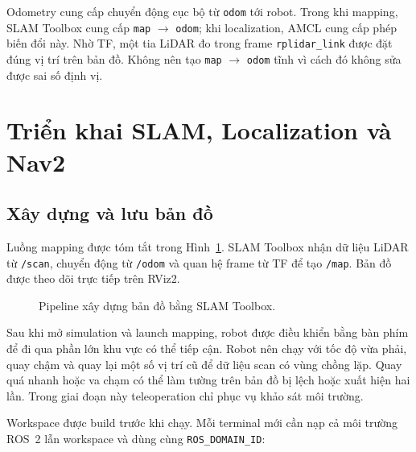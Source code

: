 \documentclass[12pt,a4paper]{article}
\begin{document}
Odometry cung cấp chuyển động cục bộ từ \texttt{odom} tới robot. Trong khi
mapping, SLAM Toolbox cung cấp \texttt{map} $\rightarrow$ \texttt{odom}; khi
localization, AMCL cung cấp phép biến đổi này. Nhờ TF, một tia LiDAR đo trong
frame \texttt{rplidar\_link} được đặt đúng vị trí trên bản đồ. Không nên tạo
\texttt{map} $\rightarrow$ \texttt{odom} tĩnh vì cách đó không sửa được sai số
định vị.

\section{Triển khai SLAM, Localization và Nav2}

\subsection{Xây dựng và lưu bản đồ}

Luồng mapping được tóm tắt trong Hình~\ref{fig:slam-flow}. SLAM Toolbox nhận
dữ liệu LiDAR từ \texttt{/scan}, chuyển động từ \texttt{/odom} và quan hệ frame
từ TF để tạo \texttt{/map}. Bản đồ được theo dõi trực tiếp trên RViz2.

\begin{figure}[htbp]
  \centering
  \caption{Pipeline xây dựng bản đồ bằng SLAM Toolbox.}
  \label{fig:slam-flow}
\end{figure}

Sau khi mở simulation và launch mapping, robot được điều khiển bằng bàn phím
để đi qua phần lớn khu vực có thể tiếp cận. Robot nên chạy với tốc độ vừa phải,
quay chậm và quay lại một số vị trí cũ để dữ liệu scan có vùng chồng lặp. Quay
quá nhanh hoặc va chạm có thể làm tường trên bản đồ bị lệch hoặc xuất hiện hai
lần. Trong giai đoạn này teleoperation chỉ phục vụ khảo sát môi trường.

Workspace được build trước khi chạy. Mỗi terminal mới cần nạp cả môi trường
ROS~2 lẫn workspace và dùng cùng \texttt{ROS\_DOMAIN\_ID}:
\end{document}
